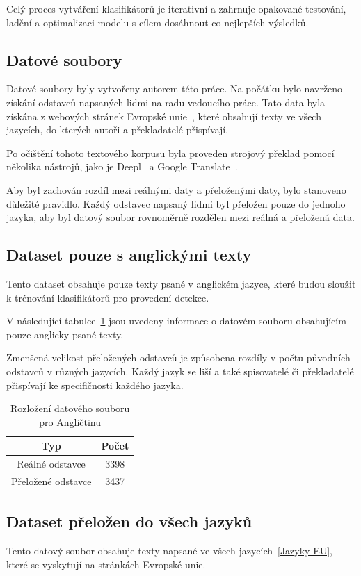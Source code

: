 Celý proces vytváření klasifikátorů je iterativní a zahrnuje opakované testování, ladění a optimalizaci modelu s cílem dosáhnout co nejlepších výsledků.

\subsection{Datové soubory}
Datové soubory byly vytvořeny autorem této práce.
Na počátku bylo navrženo získání odstavců napsaných lidmi na radu vedoucího práce.
Tato data byla získána z webových stránek Evropské unie~\cite{link35}, které obsahují texty ve všech jazycích, do kterých autoři a překladatelé přispívají.

Po očištění tohoto textového korpusu byla proveden strojový překlad pomocí několika nástrojů, jako je Deepl~\cite{link37} a Google Translate~\cite{link36}.

Aby byl zachován rozdíl mezi reálnými daty a přeloženými daty, bylo stanoveno důležité pravidlo.
Každý odstavec napsaný lidmi byl přeložen pouze do jednoho jazyka, aby byl datový soubor rovnoměrně rozdělen mezi reálná a přeložená data.

\subsection{Dataset pouze s anglickými texty}
Tento dataset obsahuje pouze texty psané v anglickém jazyce, které budou sloužit k trénování klasifikátorů pro provedení detekce. 

V následující tabulce~\ref{tab:English dataset} jsou uvedeny informace o datovém souboru obsahujícím pouze anglicky psané texty. 

Zmenšená velikost přeložených odstavců je způsobena rozdíly v počtu původních odstavců v různých jazycích.
Každý jazyk se liší a také spisovatelé či překladatelé přispívají ke specifičnosti každého jazyka.
\begin{table}[H]
	\centering
	\caption{Rozložení datového souboru pro Angličtinu}\label{tab:English dataset}
	\begin{tabular}{ c c }
			\toprule
			Typ & Počet\\
			\midrule
			Reálné odstavce & 3398\\
			Přeložené odstavce & 3437\\
			\midrule
		\end{tabular}
\end{table}

\subsection{Dataset přeložen do všech jazyků}
Tento datový soubor obsahuje texty napsané ve všech jazycích~\ref{Jazyky EU}, které se vyskytují na stránkách Evropské unie.

